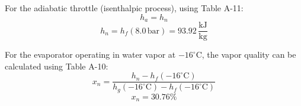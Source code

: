 For the adiabatic throttle (isenthalpic process), using Table A-11:  
\[
h_a = h_n
\]  
\[
h_n = h_f(8.0 \, \text{bar}) = 93.92 \, \frac{\text{kJ}}{\text{kg}}
\]  

For the evaporator operating in water vapor at \( -16^\circ\text{C} \), the vapor quality can be calculated using Table A-10:  
\[
x_n = \frac{h_n - h_f(-16^\circ\text{C})}{h_g(-16^\circ\text{C}) - h_f(-16^\circ\text{C})}
\]  
\[
x_n = 30.76\%
\]